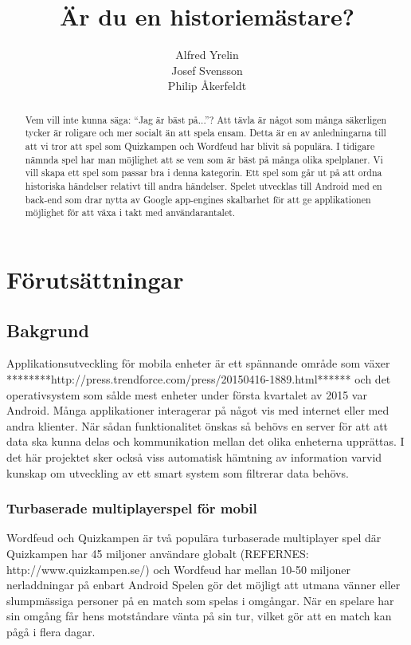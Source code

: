 \documentclass[swedish,12pt,a4paper]{article}
\author{Alfred Yrelin\\Josef Svensson\\Philip Åkerfeldt}
\title{Är du en historiemästare?}
\begin{document}
\maketitle
\newpage
\begin{abstract}Vem vill inte kunna säga: ``Jag är bäst på...''? Att tävla är något som många säkerligen tycker är roligare och mer socialt än att spela ensam. Detta är en av anledningarna till att vi tror att spel som Quizkampen och Wordfeud har blivit så populära. I tidigare nämnda spel har man möjlighet att se vem som är bäst på många olika spelplaner. Vi vill skapa ett spel som passar bra i denna kategorin. Ett spel som går ut på att ordna historiska händelser relativt till andra händelser. Spelet utvecklas till Android med en back-end som drar nytta av Google app-engines skalbarhet för att ge applikationen möjlighet för att växa i takt med användarantalet. 

\end{abstract}
\pagebreak
\tableofcontents

\section{Förutsättningar}
\subsection{Bakgrund}

Applikationsutveckling för mobila enheter är ett spännande område som växer ********http://press.trendforce.com/press/20150416-1889.html****** och det operativsystem som sålde mest enheter under första kvartalet av 2015 var Android. Många applikationer interagerar på något vis med internet eller med andra klienter. När sådan funktionalitet önskas så behövs en server för att att data ska kunna delas och kommunikation mellan det olika enheterna upprättas. I det här projektet sker också viss automatisk hämtning av information varvid kunskap om utveckling av ett smart system som filtrerar data behövs.


\subsubsection{Turbaserade multiplayerspel för mobil}
Wordfeud och Quizkampen är två populära turbaserade multiplayer spel där Quizkampen har 45 miljoner användare globalt (REFERNES: http://www.quizkampen.se/) och Wordfeud har mellan 10-50 miljoner nerladdningar på enbart Android Spelen gör det möjligt att utmana vänner eller slumpmässiga personer på en match som spelas i omgångar. När en spelare har sin omgång får hens motståndare vänta på sin tur, vilket gör att en match kan pågå i flera dagar. \cite{r}
\end{document}
